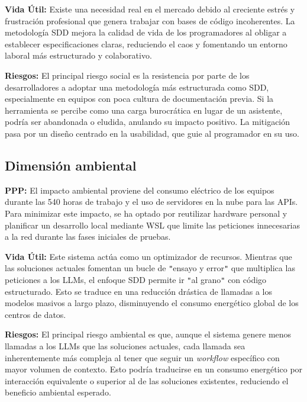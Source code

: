 \documentclass[11pt, letterpaper]{article}
\begin{document}
\textbf{Vida Útil:} Existe una necesidad real en el mercado debido al creciente estrés y frustración profesional que genera trabajar con bases de código incoherentes. La metodología SDD mejora la calidad de vida de los programadores al obligar a establecer especificaciones claras, reduciendo el caos y fomentando un entorno laboral más estructurado y colaborativo.

\textbf{Riesgos:} El principal riesgo social es la resistencia por parte de los desarrolladores a adoptar una metodología más estructurada como SDD, especialmente en equipos con poca cultura de documentación previa. Si la herramienta se percibe como una carga burocrática en lugar de un asistente, podría ser abandonada o eludida, anulando su impacto positivo. La mitigación pasa por un diseño centrado en la usabilidad, que guie al programador en su uso.

\subsection{Dimensión ambiental}
\textbf{PPP:} El impacto ambiental proviene del consumo eléctrico de los equipos durante las 540 horas de trabajo y el uso de servidores en la nube para las APIs. Para minimizar este impacto, se ha optado por reutilizar hardware personal y planificar un desarrollo local mediante WSL que limite las peticiones innecesarias a la red durante las fases iniciales de pruebas.

\textbf{Vida Útil:} Este sistema actúa como un optimizador de recursos. Mientras que las soluciones actuales fomentan un bucle de \verb|"|ensayo y error\verb|"| que multiplica las peticiones a los LLMs, el enfoque SDD permite ir \verb|"|al grano\verb|"| con código estructurado. Esto se traduce en una reducción drástica de llamadas a los modelos masivos a largo plazo, disminuyendo el consumo energético global de los centros de datos.

\textbf{Riesgos:} El principal riesgo ambiental es que, aunque el sistema genere menos llamadas a los LLMs que las soluciones actuales, cada llamada sea inherentemente más compleja al tener que seguir un \textit{workflow} específico con mayor volumen de contexto. Esto podría traducirse en un consumo energético por interacción equivalente o superior al de las soluciones existentes, reduciendo el beneficio ambiental esperado.




%
%

\newpage

 

\end{document}
